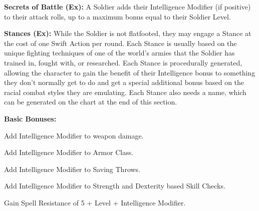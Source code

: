 \textbf{Secrets of Battle (Ex):} A Soldier adds their Intelligence Modifier (if positive) to their attack rolls, up to a maximum bonus equal to their Soldier Level.

\textbf{Stances (Ex):} While the Soldier is not flatfooted, they may engage a Stance at the cost of one Swift Action per round. Each Stance is usually based on the unique fighting techniques of one of the world's armies that the Soldier has trained in, fought with, or researched. Each Stance is procedurally generated, allowing the character to gain the benefit of their Intelligence bonus to something they don't normally get to do and get a special additional bonus based on the racial combat styles they are emulating. Each Stance also needs a name, which can be generated on the chart at the end of this section.

\textbf{Basic Bonuses:}
\begin{itemize*}
\item Add Intelligence Modifier to weapon damage.
\item Add Intelligence Modifier to Armor Class.
\item Add Intelligence Modifier to Saving Throws.
\item Add Intelligence Modifier to Strength and Dexterity based Skill Checks.
\item Gain Spell Resistance of 5 + Level + Intelligence Modifier.
\end{itemize*}

